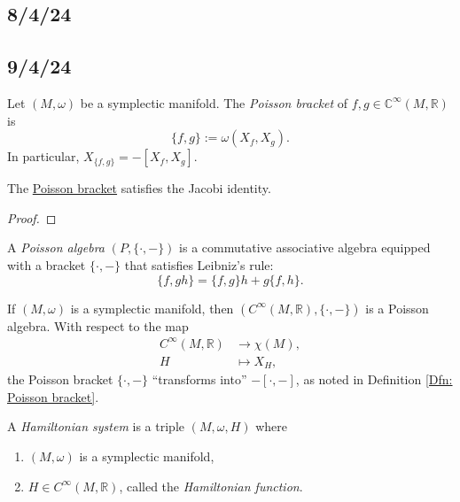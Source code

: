 \documentclass[misc]{subfiles}
\begin{document}
\subsection*{8/4/24}\label{Ssec: 8/4/24}


\subsection*{9/4/24}\label{Ssec: 9/4/24}

\begin{Dfn}\label{Dfn: Poisson bracket}
    Let $(M,\omega)$ be a symplectic manifold. The \emph{Poisson bracket} of $f,g\in\mathbb{C}^\infty(M,\mathbb{R})$ is
    \[
    \{f,g\} := \omega(X_f,X_g).
    \] 
    In particular, $X_{\{f,g\}} = -[X_f,X_g]$.
\end{Dfn}

\begin{Thm}[]\label{Thm: Poisson Jacobi}
    The \hyperref[Dfn: Poisson bracket]{Poisson bracket} satisfies the Jacobi identity.

    \begin{proof}
    \end{proof}
\end{Thm}

\begin{Dfn}\label{Dfn: Poisson algebra}
    A \emph{Poisson algebra} $(P,\{\cdot,-\})$ is a commutative associative algebra equipped with a bracket $\{\cdot,-\}$ that satisfies Leibniz's rule:
    \[
    \{f,gh\} = \{f,g\}h + g\{f,h\}.
    \] 
\end{Dfn}

\begin{Exp}
    If $(M,\omega)$ is a symplectic manifold, then $(C^\infty(M,\mathbb{R}),\{\cdot,-\})$ is a Poisson algebra. With respect to the map
    \begin{align*}
        C^\infty(M,\mathbb{R}) &\to \chi(M), \\
        H &\mapsto X_H,
    \end{align*}
    the Poisson bracket $\{\cdot,-\}$ ``transforms into'' $-[\cdot,-]$, as noted in Definition \ref{Dfn: Poisson bracket}.
\end{Exp}

\begin{Dfn}\label{Dfn: Hamiltonian system}
    A \emph{Hamiltonian system} is a triple $(M,\omega,H)$ where
    \begin{enumerate}
    
        \item $(M,\omega)$ is a symplectic manifold,

        \item $H\in C^\infty(M,\mathbb{R})$, called the \emph{Hamiltonian function}.
    \end{enumerate}
\end{Dfn}
\end{document}
